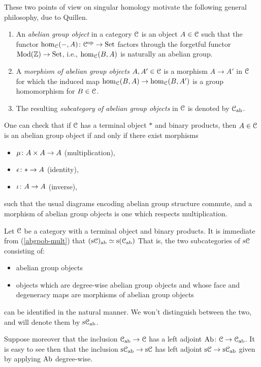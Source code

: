 These two points of view on singular homology motivate the following
general philosophy, due to Quillen.

\begin{definitions}
  \begin{enumerate}[leftmargin=*]
  \item An \emph{abelian group object} in a category $\mathcal{C}$ is an object $A
    \in \mathcal{C}$ such that the functor $\operatorname{hom}_{\mathcal{C}}(-,A) \colon \mathcal{C}^{\mathrm{op}} \to \mathrm{Set}$
    factors through the forgetful functor $\mathrm{Mod}(\mathbb{Z}) \to \mathrm{Set}$, i.e.,
    $\operatorname{hom}_{\mathcal{C}}(B,A)$ is naturally an abelian group.
  \item A \emph{morphism of abelian group objects} $A,A' \in \mathcal{C}$ is a
    morphism $A \to A'$ in $\mathcal{C}$ for which the induced map $\operatorname{hom}_{\mathcal{C}}(B,A)
    \to \operatorname{hom}_{\mathcal{C}}(B,A')$ is a group homomorphism for $B \in \mathcal{C}$.
  \item The resulting \emph{subcategory of abelian group objects} in
    $\mathcal{C}$ is denoted by $\mathcal{C}_{\mathrm{ab}}$.
  \end{enumerate}
\end{definitions}

\begin{nothing}
  \label{abgpob-mult}
  One can check that if $\mathcal{C}$ has a terminal object $*$ and binary
  products, then $A \in \mathcal{C}$ is an abelian group object if and only if
  there exist morphisms
  \begin{itemize}
  \item $\mu \colon A \times A \to A$ (multiplication),
  \item $\epsilon \colon * \to A$ (identity),
  \item $\iota \colon A \to A$ (inverse),
  \end{itemize}
  such that the usual diagrams encoding abelian group structure
  commute, and a morphism of abelian group objects is one which
  respects multiplication.
\end{nothing}

\begin{nothing}
  \label{simplab}
  Let $\mathcal{C}$ be a category with a terminal object and binary
  products. It is immediate from (\ref{abgpob-mult}) that
  $(\mathrm{s}\mathcal{C})_{\mathrm{ab}} \simeq \mathrm{s}(\mathcal{C}_{\mathrm{ab}})$ That is, the two subcategories of
  $\mathrm{s}\mathcal{C}$ consisting of:
  \begin{itemize}
  \item abelian group objects
  \item objects which are degree-wise abelian group objects and whose
    face and degeneracy maps are morphisms of abelian group objects
  \end{itemize}
  can be identified in the natural manner. We won't distinguish
  between the two, and will denote them by $\mathrm{s}\mathcal{C}_{\mathrm{ab}}$.

  Suppose moreover that the inclusion $\mathcal{C}_{\mathrm{ab}} \to \mathcal{C}$ has a left
  adjoint $\operatorname{Ab} \colon \mathcal{C} \to \mathcal{C}_{\mathrm{ab}}$. It is easy to see then that the
  inclusion $\mathrm{s}\mathcal{C}_{\mathrm{ab}} \to \mathrm{s}\mathcal{C}$ has left adjoint $\mathrm{s}\mathcal{C} \to
  \mathrm{s}\mathcal{C}_{\mathrm{ab}}$ given by applying $\operatorname{Ab}$ degree-wise.
\end{nothing}

